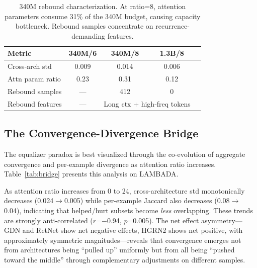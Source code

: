 \documentclass[11pt,twocolumn,a4paper]{article}
\begin{document}
\begin{table}[t]
\centering
\small
\begin{tabular}{lcccc}
\toprule
\textbf{Metric} & \textbf{340M/6} & \textbf{340M/8} & \textbf{1.3B/8} \\
\midrule
Cross-arch std & 0.009 & 0.014 & 0.006 \\
Attn param ratio & 0.23 & 0.31 & 0.12 \\
Rebound samples & --- & 412 & 0 \\
Rebound features & --- & \multicolumn{2}{c}{Long ctx + high-freq tokens} \\
\bottomrule
\end{tabular}
\caption{340M rebound characterization. At ratio=8, attention parameters consume 31\% of the 340M budget, causing capacity bottleneck. Rebound samples concentrate on recurrence-demanding features.}
\label{tab:rebound}
\end{table}

\subsection{The Convergence-Divergence Bridge}
\label{sec:bridge}

The equalizer paradox is best visualized through the co-evolution of aggregate convergence and per-example divergence as attention ratio increases. Table~\ref{tab:bridge} presents this analysis on LAMBADA.

As attention ratio increases from 0 to 24, cross-architecture std monotonically decreases (0.024$\to$0.005) while per-example Jaccard also decreases (0.08$\to$0.04), indicating that helped/hurt subsets become \emph{less} overlapping. These trends are strongly anti-correlated ($r$=$-$0.94, $p$=0.005). The net effect asymmetry---GDN and RetNet show net negative effects, HGRN2 shows net positive, with approximately symmetric magnitudes---reveals that convergence emerges not from architectures being ``pulled up'' uniformly but from all being ``pushed toward the middle'' through complementary adjustments on different samples.
\end{document}
